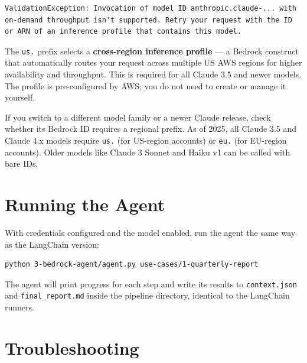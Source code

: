 \documentclass[12pt, a4paper]{article}
\begin{document}
\begin{lstlisting}[language={}]
ValidationException: Invocation of model ID anthropic.claude-... with
on-demand throughput isn't supported. Retry your request with the ID
or ARN of an inference profile that contains this model.
\end{lstlisting}

The \texttt{us.} prefix selects a \textbf{cross-region inference profile} — a Bedrock construct that automatically routes your request across multiple US AWS regions for higher availability and throughput. This is required for all Claude 3.5 and newer models. The profile is pre-configured by AWS; you do not need to create or manage it yourself.

\begin{notebox}
If you switch to a different model family or a newer Claude release, check whether its Bedrock ID requires a regional prefix. As of 2025, all Claude 3.5 and Claude 4.x models require \texttt{us.} (for US-region accounts) or \texttt{eu.} (for EU-region accounts). Older models like Claude 3 Sonnet and Haiku v1 can be called with bare IDs.
\end{notebox}

\section{Running the Agent}

With credentials configured and the model enabled, run the agent the same way as the LangChain version:

\begin{lstlisting}[style=shellstyle]
python 3-bedrock-agent/agent.py use-cases/1-quarterly-report
\end{lstlisting}

The agent will print progress for each step and write its results to \texttt{context.json} and \texttt{final\_report.md} inside the pipeline directory, identical to the LangChain runners.

\section{Troubleshooting}
\end{document}

